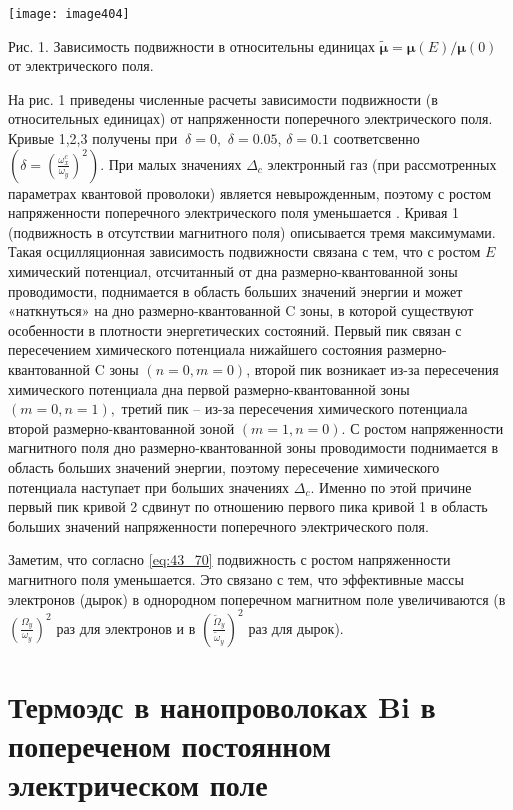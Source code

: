 \noindent \texttt{[image: image404]}

\noindent Рис. 1. Зависимость подвижности в относительны единицах $\widetilde{{\mathbf \mu }}={{\mathbf \mu }\left(E\right)}/{{\mathbf \mu }\left(0\right)}$ от электрического поля.

На рис. 1 приведены численные расчеты зависимости подвижности (в относительных единицах) от напряженности поперечного электрического поля. Кривые 1,2,3 получены при $\ \delta =0,$ $\delta =0.05$, $\delta =0.1$ соответсвенно $\left(\delta ={\left(\frac{{\omega }^c_x}{{\omega }_y}\right)}^2\right)$. При малых значениях ${\Delta }_c$ электронный газ (при рассмотренных параметрах квантовой проволоки) является невырожденным, поэтому с ростом напряженности поперечного электрического поля уменьшается \cite{Karapetyan2012}. Кривая 1 (подвижность в отсутствии  магнитного поля) описывается тремя максимумами. Такая осцилляционная зависимость подвижности связана с тем, что с ростом $E$ химический потенциал, отсчитанный от дна размерно-квантованной зоны проводимости, поднимается в область больших значений энергии и может «наткнуться» на дно размерно-квантованной C зоны, в которой существуют особенности в плотности энергетических состояний. Первый пик связан с пересечением химического потенциала нижайшего состояния размерно-квантованной C зоны $\left(n=0,m=0\right)$, второй пик возникает из-за пересечения химического потенциала дна первой размерно-квантованной зоны $\left(m=0,n=1\right),$ третий пик -- из-за пересечения химического потенциала второй размерно-квантованной зоной $\left(m=1,n=0\right)$. С ростом напряженности магнитного поля дно размерно-квантованной зоны проводимости поднимается в область больших значений энергии, поэтому пересечение химического потенциала наступает при больших значениях ${\Delta }_c$. Именно по этой причине первый пик кривой 2  сдвинут по отношению первого пика кривой 1 в область больших значений напряженности поперечного электрического поля.

Заметим, что согласно \eqref{eq:43_70} подвижность с ростом напряженности магнитного поля уменьшается. Это связано с тем, что эффективные массы электронов (дырок) в однородном поперечном магнитном поле увеличиваются (в ${\left(\frac{\Omega_y}{\omega_y}\right)}^2$ раз для электронов и в ${\left(\frac{{\widetilde{\Omega }}_y}{{\widetilde{\omega }}_y}\right)}^2$ раз для дырок).

\section{Термоэдс в нанопроволоках Bi в попереченом постоянном электрическом поле}\label{sect4_4}

